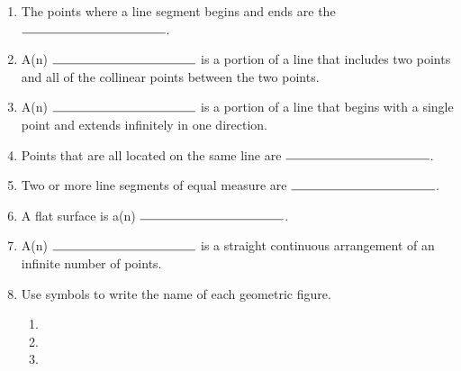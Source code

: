\documentclass[12pt, twoside]{article}
\begin{document}
\begin{enumerate}
\newpage
\item The points where a line segment begins and ends are the $\rule{4cm}{0.15mm}$. \bigskip
\item A(n) $\rule{4cm}{0.15mm}$ is a portion of a line that includes two points and all of the collinear points between the two points.\bigskip
\item A(n) $\rule{4cm}{0.15mm}$ is a portion of a line that begins with a single point and extends infinitely in one direction.
\item Points that are all located on the same line are $\rule{4cm}{0.15mm}$.\bigskip
\item Two or more line segments of equal measure are $\rule{4cm}{0.15mm}$.\bigskip
\item A flat surface is a(n) $\rule{4cm}{0.15mm}$. \bigskip
\item A(n) $\rule{4cm}{0.15mm}$ is a straight continuous arrangement of an infinite number of points.
    \bigskip
\item Use symbols to write the name of each geometric figure.
  \begin{enumerate}
  \item %
     \bigskip
  \item \hspace{1cm}%
     \bigskip
    \item %
  \end{enumerate}

\end{enumerate}
\end{document}
